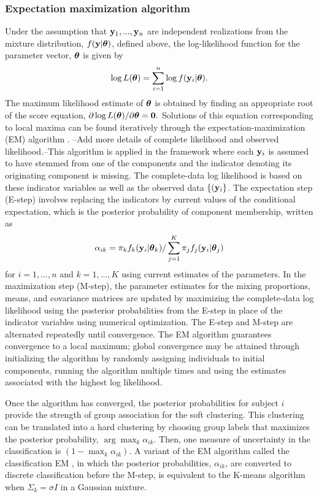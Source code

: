 \subsubsection{Expectation maximization algorithm}
Under the assumption that $\mathbf y_{1},...,\mathbf y_{n}$ are independent realizations from the mixture distribution, $f(\mathbf y | \boldsymbol\theta)$, defined above, the log-likelihood function for the parameter vector, $\boldsymbol \theta$ is given by
$$\log L(\boldsymbol\theta)=\sum^{n}_{i=1}\log f(\mathbf y_{i}|\boldsymbol \theta).$$
The maximum likelihood estimate of $\boldsymbol\theta$ is obtained by finding an appropriate root of the score equation, $\partial \log L(\boldsymbol\theta)/\partial \boldsymbol\theta=\mathbf 0.$ Solutions of this equation corresponding to local maxima can be found iteratively through the expectation-maximization (EM) algorithm \cite{dempster1977}. --Add more details of complete likelihood and observed likelihood.--This algorithm is applied in the framework where each $\mathbf y_{i}$ is assumed to have stemmed from one of the components and the indicator denoting its originating component is missing. The complete-data log likelihood is based on these indicator variables as well as the observed data $\{(\mathbf y_{i}\}$. The expectation step (E-step) involves replacing the indicators by current values of the conditional expectation, which is the posterior probability of component membership, written as
$$\alpha_{ik}=\pi_{k}f_{k}(\mathbf y_{i}|\boldsymbol\theta_{k})/\sum_{j=1}^{K}\pi_{j}f_{j}(\mathbf y_{i}|\boldsymbol \theta_{j})$$
for $i=1,...,n$ and $k=1,...,K$ using current estimates of the parameters. In the maximization step (M-step), the parameter estimates for the mixing proportions, means, and covariance matrices are updated by maximizing the complete-data log likelihood using the posterior probabilities from the E-step in place of the indicator variables using numerical optimization. The E-step and M-step are alternated repeatedly until convergence. The EM algorithm guarantees convergence to a local maximum; global convergence may be attained through initializing the algorithm by randomly assigning individuals to initial components, running the algorithm multiple times and using the estimates associated with the highest log likelihood.

Once the algorithm has converged, the posterior probabilities for subject $i$ provide the strength of group association for the soft clustering. This clustering can be translated into a hard clustering by choosing group labels that maximizes the posterior probability, $\arg\max_k \alpha_{ik}$. Then, one measure of uncertainty in the classification is $(1-\max_k\alpha_{ik}).$ A variant of the EM algorithm called the classification EM \cite{celeux1992}, in which the posterior probabilities, $\alpha_{ik}$, are converted to discrete classification before the M-step, is equivalent to the K-means algorithm when $\Sigma_{k} =\sigma I$ in a Gaussian mixture. 

